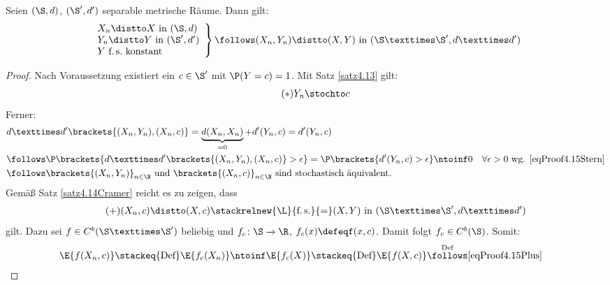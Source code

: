 \begin{satz}\label{satz4.15CramerSlutsky}
	Seien $(\S,d)$, $(\S',d')$ separable metrische Räume.
	Dann gilt:
	\begin{align*}
		\left.\begin{array}{l}
			X_n\distto  X\text{ in }(\S,d)\\
			Y_n\distto  Y\text{ in }(\S',d')\\
			Y\text{ f.\,s.\ konstant}
		\end{array}\right\rbrace
		\follows (X_n,Y_n)\distto (X,Y)\text{ in }(\S×\S',d× d')
	\end{align*}
\end{satz}

\begin{proof}
	Nach Voraussetzung existiert ein $c\in\S'$ mit $\P(Y=c)=1$.
	Mit Satz \ref{satz4.13} gilt:
	\begin{align}\label{eqProof4.15Stern}\tag{$\ast$}
		Y_n \stochto  c
	\end{align}
	Ferner:
	\begin{align*}
		&d× d'\brackets{(X_n,Y_n),(X_n,c)}
		=\underbrace{d(X_n,X_n)}_{=0}+d'(Y_n,c)
		=d'(Y_n,c)\\
		&\follows\P\brackets{d× d'\brackets{(X_n,Y_n),(X_n,c)}>\epsilon}
		=\P\brackets{d'(Y_n,c)>\epsilon}
		\ntoinf  0\quad\forall\epsilon>0\text{ wg. } \eqref{eqProof4.15Stern}\\
		&\follows
		\brackets{(X_n,Y_n)}_{n\in\N}\text{ und }\brackets{(X_n,c)}_{n\in\N}\text{ sind stochastisch äquivalent.}
	\end{align*}
	Gemäß Satz \ref{satz4.14Cramer} reicht es zu zeigen, dass
	\begin{align}\label{eqProof4.15Plus}\tag{+}
		(X_n,c)\distto (X,c)\stackrelnew{\L}{\text{f.\,s.}}{=}(X,Y)\text{ in }(\S×\S',d× d')
	\end{align}
	gilt.
	Dazu sei $f\in C^b(\S×\S')$ beliebig und $f_c \colon \S \to \R$, $f_c(x)\defeqf(x,c)$.
	Damit folgt $f_c\in C^b(\S)$.
	Somit:
	\begin{align*}
		\E{f(X_n,c)}
		&\stackeq{\text{Def}}
		\E{f_c(X_n)}
		\ntoinf \E{f_c(X)}\stackeq{\text{Def}}
		\E{f(X,c)}
		\overset{\text{Def}}{\follows}
		\eqref{eqProof4.15Plus}
		&\qedhere
	\end{align*}
\end{proof}

